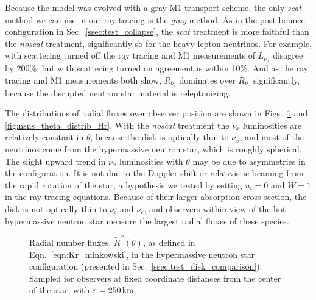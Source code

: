 \documentclass[aps,floatfix,prd,superscriptaddress,twocolumn]{revtex4-1}
\begin{document}
Because the model was evolved with a gray M1 transport scheme,
the only \emph{scat} method we can use in our ray tracing is the
\emph{gray} method.
As in the post-bounce configuration in Sec.~\ref{ssec:test_collapse},
the \emph{scat} treatment is more faithful than the \emph{noscat} treatment,
significantly so for the heavy-lepton neutrinos.
For example, with scattering turned off the ray tracing and M1 measurements
of $L_{\nu_x}$ disagree by 200\%;
but with scattering turned on agreement is within 10\%.
And as the ray tracing and M1 measurements both show,
$R_{\bar{\nu}_e}$ dominates over $R_{\nu_e}$ significantly,
because the disrupted neutron star material is releptonizing.

The distributions of radial fluxes over observer position are shown
in Figs.~\ref{fig:nsns_theta_distrib_Kr} and \ref{fig:nsns_theta_distrib_Hr}.
With the \emph{noscat} treatment the $\nu_x$ luminosities are relatively
constant in $\theta$, because the disk is optically thin to $\nu_x$,
and most of the neutrinos come from the hypermassive neutron star,
which is roughly spherical.
The slight upward trend in $\nu_x$ luminosities with $\theta$ may be due to
asymmetries in the configuration.
It is not due to the Doppler shift or relativistic beaming
from the rapid rotation of the star,
a hypothesis we tested by setting $u_i=0$ and $W=1$ in the ray
tracing equations.
Because of their larger absorption cross section,
the disk is not optically thin to $\nu_e$ and $\bar{\nu}_e$,
and observers within view of the hot hypermassive neutron star measure
the largest radial fluxes of these species.
\begin{figure}
  \resizebox{\columnwidth}{!}{}
  \caption{Radial number fluxes, $\tilde{K}^r(\theta)$,
    as defined in Eqn.~\ref{eqn:Kr_minkowski},
    in the hypermassive neutron star configuration
    (presented in Sec.~\ref{ssec:test_disk_comparison}).
    Sampled for observers at fixed coordinate distances from the center
    of the star, with $r=250\,{\rm km}$.
  }
  \label{fig:nsns_theta_distrib_Kr}
\end{figure}
\end{document}
